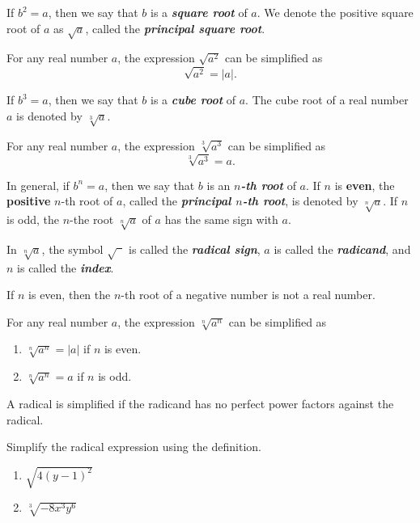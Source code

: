 \documentclass[
  en,11pt]{elegantbook}
\providecommand{\tightlist}{%
  \setlength{\itemsep}{0pt}\setlength{\parskip}{0pt}}
\renewenvironment{example}[1][]{
  \refstepcounter{exam}
  \par\noindent\textbf{\color{main}{\examplename} \theexam #1}
  \rmfamily
}{
  \par\ignorespacesafterend
}
\begin{document}
If \(b^2=a\), then we say that \(b\) is a \textbf{\emph{square root}} of \(a\). We denote the positive square root of \(a\) as \(\sqrt{a}\), called the \textbf{\emph{principal square root}}.

For any real number \(a\), the expression \(\sqrt{a^2}\) can be simplified as
\[
\sqrt{a^2}=|a|.
\]

If \(b^3=a\), then we say that \(b\) is a \textbf{\emph{cube root}} of \(a\). The cube root of a real number \(a\) is denoted by \(\sqrt[3]{a}\).

For any real number \(a\), the expression \(\sqrt[3]{a^3}\) can be simplified as
\[
\sqrt[3]{a^3}=a.
\]

In general, if \(b^n=a\), then we say that \(b\) is an \textbf{\emph{\(n\)-th root}} of \(a\). If \(n\) is \textbf{even}, the \textbf{positive} \(n\)-th root of \(a\), called the \textbf{\emph{principal \(n\)-th root}}, is denoted by \(\sqrt[n]{a}\). If \(n\) is odd, the \(n\)-the root \(\sqrt[n]{a}\) of \(a\) has the same sign with \(a\).

In \(\sqrt[n]{a}\), the symbol \(\sqrt{\phantom{a}}\) is called the \textbf{\emph{radical sign}}, \(a\) is called the \textbf{\emph{radicand}}, and \(n\) is called the \textbf{\emph{index}}.

If \(n\) is even, then the \(n\)-th root of a negative number is not a real number.

For any real number \(a\), the expression \(\sqrt[n]{a^n}\) can be simplified as

\begin{enumerate}
\def\labelenumi{\arabic{enumi}.}
\tightlist
\item
  \(\sqrt[n]{a^n}=|a|\) if \(n\) is even.
\item
  \(\sqrt[n]{a^n}=a\) if \(n\) is odd.
\end{enumerate}

A radical is simplified if the radicand has no perfect power factors against the radical.

\begin{example}

Simplify the radical expression using the definition.

\begin{enumerate}
\def\labelenumi{\arabic{enumi}.}
\tightlist
\item
  \(\sqrt{4(y-1)^2}\)
\item
  \(\sqrt[3]{-8x^3y^6}\)
\end{enumerate}

\end{example}
\end{document}
